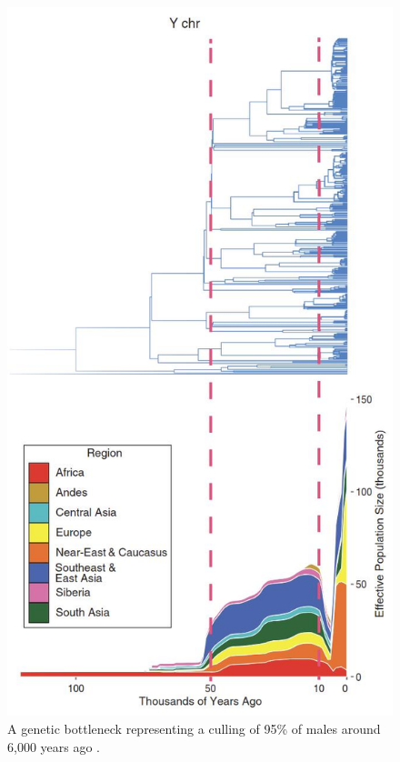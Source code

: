 \documentclass[10pt,twocolumn,letterpaper]{article}
\begin{document}
\begin{figure}[b]
\begin{center}
   \includegraphics[width=1\linewidth]{bottleneck.jpg}
\end{center}
   \caption{A genetic bottleneck representing a culling of 95\% of males around 6,000 years ago \cite{62}.}
\label{fig:10}
\label{fig:onecol}
\end{figure}
\end{document}

